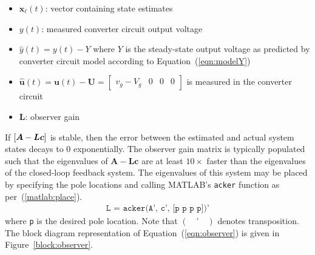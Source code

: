\begin{itemize}
\item $\boldsymbol{x}_\ell(t)$: vector containing state estimates
\item $y(t)$: measured converter circuit output voltage
\item $\hat{y}(t) = y(t) - Y$ where $Y$ is the steady-state output voltage as predicted by converter circuit model according to Equation~(\ref{eqn:modelY})
\item $\hat{\boldsymbol{u}}(t) = \boldsymbol{u}(t) - \boldsymbol{U} = \begin{bmatrix}v_g - V_g & 0 & 0 & 0\end{bmatrix}$ is measured in the converter circuit
\item $\boldsymbol{L}$: observer gain
\end{itemize}
If $\left[\boldsymbol{A} - \boldsymbol{L}\boldsymbol{c}\right]$ is stable, then the error between the estimated and actual system states decays to 0 exponentially.
\newpar
The observer gain matrix is typically populated such that the eigenvalues of $\boldsymbol{A} - \boldsymbol{L}\boldsymbol{c}$ are at least $10 \times$ faster than the eigenvalues of the closed-loop feedback system. The eigenvalues of this system may be placed by specifying the pole locations and calling \textsf{MATLAB}'s \texttt{acker} function as per~(\ref{matlab:place}).
\begin{align}
\texttt{L = acker(A', c', [p p p p])'}
\label{matlab:place}
\end{align}
where \texttt{p} is the desired pole location. Note that $(\quad\texttt{'}\quad)$ denotes transposition.
The block diagram representation of Equation~(\ref{eqn:observer}) is given in Figure~\ref{block:observer}.
